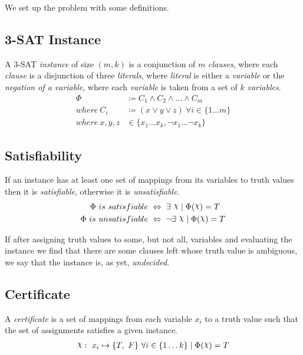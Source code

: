 We set up the problem with some definitions.


\subsection*{3-SAT Instance}

A 3-SAT \textit{instance} of size $(m, k)$ is a conjunction of $m$ \textit{clauses}, where each \textit{clause} is a disjunction of three \textit{literals}, where \textit{literal} is either a \textit{variable} or the \textit{negation of a variable}, where each \textit{variable} is taken from a set of $k$ \textit{variables}.
\begin{align*}
    \Phi & \coloneqq C_1 \land C_2 \land \ldots \land C_m \\
    where~ C_i & \coloneqq (x \lor y \lor z)~ \forall i \in \{ 1 \ldots m \} \\
    where~ x, y, z & \in \{ x_1 \ldots x_k, \lnot x_1 \ldots \lnot x_k \}
\end{align*}


\subsection*{Satisfiability}

If an instance has at least one set of mappings from its variables to truth values then it is \textit{satisfiable}, otherwise it is \textit{unsatisfiable}.
\begin{align*}
    \Phi~ is~ satisfiable~ & \Leftrightarrow~ \exists~ \rchi \mid \Phi(\rchi) = T \\
    \Phi~ is~ unsatisfiable~ & \Leftrightarrow~ \lnot \exists~ \rchi \mid \Phi(\rchi) = T
\end{align*}

If after assigning truth values to some, but not all, variables and evaluating the instance we find that there are some clauses left whose truth value is ambiguous, we say that the instance is, as yet, \textit{undecided}.


\subsection*{Certificate}

A \textit{certificate} is a set of mappings from each variable $x_i$ to a truth value such that the set of assignments satisfies a given instance.
\begin{align*}
    \rchi :~ x_i \mapsto \{ T,~ F \}~ \forall i \in \{ 1 \ldots k \}
    \mid \Phi(\rchi) = T
\end{align*}


